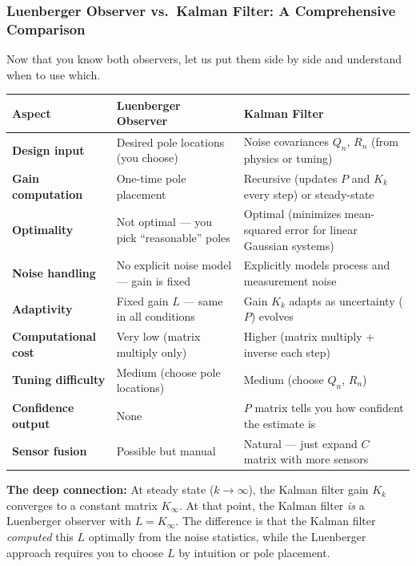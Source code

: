 \subsubsection{Luenberger Observer vs.\ Kalman Filter: A Comprehensive Comparison}

Now that you know both observers, let us put them side by side and understand when to use which.

\begin{center}
\begin{tabular}{p{3.5cm}p{5.5cm}p{5.5cm}}
\toprule
\textbf{Aspect} & \textbf{Luenberger Observer} & \textbf{Kalman Filter} \\
\midrule
\textbf{Design input} & Desired pole locations (you choose) & Noise covariances $Q_n$, $R_n$ (from physics or tuning) \\
\textbf{Gain computation} & One-time pole placement & Recursive (updates $P$ and $K_k$ every step) or steady-state \\
\textbf{Optimality} & Not optimal --- you pick ``reasonable'' poles & Optimal (minimizes mean-squared error for linear Gaussian systems) \\
\textbf{Noise handling} & No explicit noise model --- gain is fixed & Explicitly models process and measurement noise \\
\textbf{Adaptivity} & Fixed gain $L$ --- same in all conditions & Gain $K_k$ adapts as uncertainty ($P$) evolves \\
\textbf{Computational cost} & Very low (matrix multiply only) & Higher (matrix multiply + inverse each step) \\
\textbf{Tuning difficulty} & Medium (choose pole locations) & Medium (choose $Q_n$, $R_n$) \\
\textbf{Confidence output} & None & $P$ matrix tells you how confident the estimate is \\
\textbf{Sensor fusion} & Possible but manual & Natural --- just expand $C$ matrix with more sensors \\
\bottomrule
\end{tabular}
\end{center}

\textbf{The deep connection:} At steady state ($k \to \infty$), the Kalman filter gain $K_k$ converges to a constant matrix $K_\infty$. At that point, the Kalman filter \textit{is} a Luenberger observer with $L = K_\infty$. The difference is that the Kalman filter \textit{computed} this $L$ optimally from the noise statistics, while the Luenberger approach requires you to choose $L$ by intuition or pole placement.

